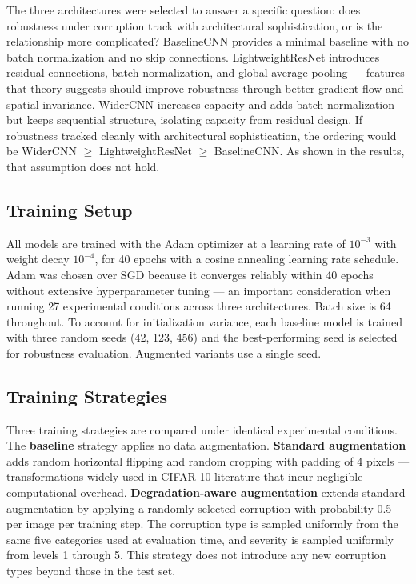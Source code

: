 \documentclass[conference]{IEEEtran}
\begin{document}
The three architectures were selected to answer a specific question: does robustness under corruption track with architectural sophistication, or is the relationship more complicated? BaselineCNN provides a minimal baseline with no batch normalization and no skip connections. LightweightResNet introduces residual connections, batch normalization, and global average pooling --- features that theory suggests should improve robustness through better gradient flow and spatial invariance. WiderCNN increases capacity and adds batch normalization but keeps sequential structure, isolating capacity from residual design. If robustness tracked cleanly with architectural sophistication, the ordering would be WiderCNN $\geq$ LightweightResNet $\geq$ BaselineCNN. As shown in the results, that assumption does not hold.

\subsection{Training Setup}

All models are trained with the Adam optimizer at a learning rate of $10^{-3}$ with weight decay $10^{-4}$, for 40 epochs with a cosine annealing learning rate schedule. Adam was chosen over SGD because it converges reliably within 40 epochs without extensive hyperparameter tuning --- an important consideration when running 27 experimental conditions across three architectures. Batch size is 64 throughout. To account for initialization variance, each baseline model is trained with three random seeds (42, 123, 456) and the best-performing seed is selected for robustness evaluation. Augmented variants use a single seed.

\subsection{Training Strategies}

Three training strategies are compared under identical experimental conditions. The \textbf{baseline} strategy applies no data augmentation. \textbf{Standard augmentation} adds random horizontal flipping and random cropping with padding of 4 pixels --- transformations widely used in CIFAR-10 literature that incur negligible computational overhead. \textbf{Degradation-aware augmentation} extends standard augmentation by applying a randomly selected corruption with probability 0.5 per image per training step. The corruption type is sampled uniformly from the same five categories used at evaluation time, and severity is sampled uniformly from levels 1 through 5. This strategy does not introduce any new corruption types beyond those in the test set.
\end{document}
